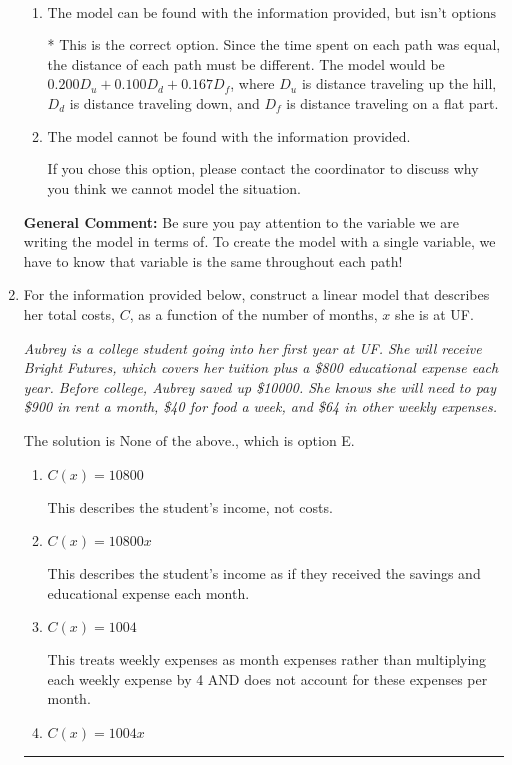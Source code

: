 \documentclass{extbook}[14pt]
\newcommand{\litem}[1]{\item #1

\rule{\textwidth}{0.4pt}}
\begin{document}
\begin{enumerate}
{\begin{enumerate}[label=\Alph*.]
The coefficient here is calculated by multiplying the distances together rather than adding.
\item \( \text{The model can be found with the information provided, but isn't options 1-3.} \)

* This is the correct option. Since the time spent on each path was equal, the distance of each path must be different. The model would be $0.200D_u + 0.100D_d + 0.167D_f$, where $D_u$ is distance traveling up the hill, $D_d$ is distance traveling down, and $D_f$ is distance traveling on a flat part.
\item \( \text{The model cannot be found with the information provided.} \)

If you chose this option, please contact the coordinator to discuss why you think we cannot model the situation.
\end{enumerate}

\textbf{General Comment:} Be sure you pay attention to the variable we are writing the model in terms of. To create the model with a single variable, we have to know that variable is the same throughout each path!
}
\litem{
For the information provided below, construct a linear model that describes her total costs, $C$, as a function of the number of months, $x$ she is at UF. 

\begin{center}
    \textit{ Aubrey is a college student going into her first year at UF. She will receive Bright Futures, which covers her tuition plus a \$800 educational expense each year. Before college, Aubrey saved up \$10000. She knows she will need to pay \$900 in rent a month, \$40 for food a week, and \$64 in other weekly expenses. }
\end{center}
The solution is \( \text{None of the above.} \), which is option E.\begin{enumerate}[label=\Alph*.]
\item \( C(x) = 10800 \)

This describes the student's income, not costs.
\item \( C(x) = 10800 x \)

This describes the student's income as if they received the savings and educational expense each month.
\item \( C(x) = 1004 \)

This treats weekly expenses as month expenses rather than multiplying each weekly expense by 4 AND does not account for these expenses per month.
\item \( C(x) = 1004 x \)


\end{enumerate}}
\end{enumerate}
\end{document}
